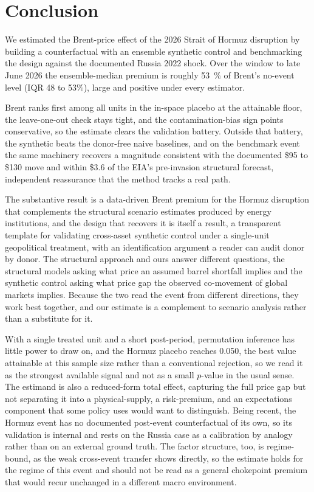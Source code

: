 \section{Conclusion}\label{sec:conclusion}
We estimated the Brent-price effect of the 2026 Strait of Hormuz disruption by building a
counterfactual with an ensemble synthetic control and benchmarking the design against the
documented Russia 2022 shock. Over the window to late June 2026 the ensemble-median premium
is roughly \SI{53}{\percent} of Brent's no-event level (IQR 48 to 53\%), large and positive
under every estimator. 

Brent ranks first among all units in the in-space placebo at the attainable floor, the
leave-one-out check stays tight, and the contamination-bias sign points conservative, so the
estimate clears the validation battery. Outside that battery, the synthetic beats the
donor-free naive baselines, and on the benchmark event the same machinery recovers a magnitude
consistent with the documented \$95 to \$130 move and within \$3.6 of the EIA's pre-invasion
structural forecast, independent reassurance that the method tracks a real path.

The substantive result is a data-driven Brent premium for the Hormuz disruption that
complements the structural scenario estimates produced by energy institutions, and the design
that recovers it is itself a result, a transparent template for validating cross-asset
synthetic control under a single-unit geopolitical treatment, with an identification argument a
reader can audit donor by donor. The structural approach and ours answer different questions,
the structural models asking what price an assumed barrel shortfall implies and the synthetic
control asking what price gap the observed co-movement of global markets implies. Because the
two read the event from different directions, they work best together, and our estimate is a
complement to scenario analysis rather than a substitute for it.

With a single treated unit and a short post-period, permutation inference has little power to
draw on, and the Hormuz placebo reaches 0.050, the
best value attainable at this sample size rather than a conventional rejection, so we read it
as the strongest available signal and not as a small $p$-value in the usual sense. The estimand
is also a reduced-form total effect, capturing the full price gap but not separating it into a
physical-supply, a risk-premium, and an expectations component that some policy uses would want
to distinguish. Being recent, the Hormuz event has no documented post-event counterfactual of
its own, so its validation is internal and rests on the Russia case as a calibration by analogy
rather than on an external ground truth. The factor structure, too, is regime-bound, as the
weak cross-event transfer shows directly, so the estimate holds for the regime of this event
and should not be read as a general chokepoint premium that would recur unchanged in a
different macro environment.

